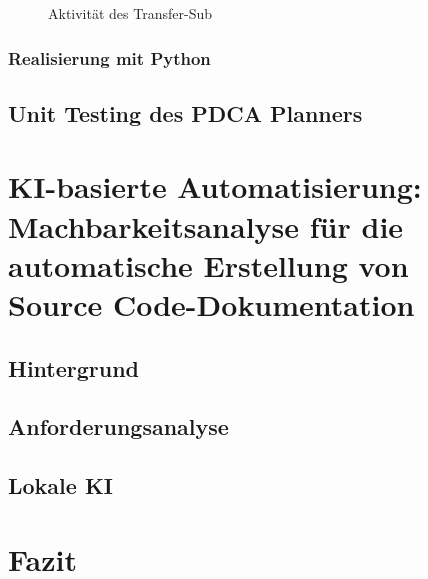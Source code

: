 \documentclass[11pt,a4paper]{report}
\begin{document}
\begin{figure}[H]
    \centerline{}
    \caption{Aktivität des Transfer-Sub}
    \label{fig:activity_transfer}
\end{figure}



\subsection{Realisierung mit Python}

\section{Unit Testing des PDCA Planners}


\chapter{
KI-basierte Automatisierung: Machbarkeitsanalyse für die automatische Erstellung
von Source Code-Dokumentation
} \label{chap:rocket}


\section{Hintergrund}



\section{Anforderungsanalyse}


\section{Lokale KI}



\chapter{Fazit} \label{chap:fazit}




\newpage


\end{document}

